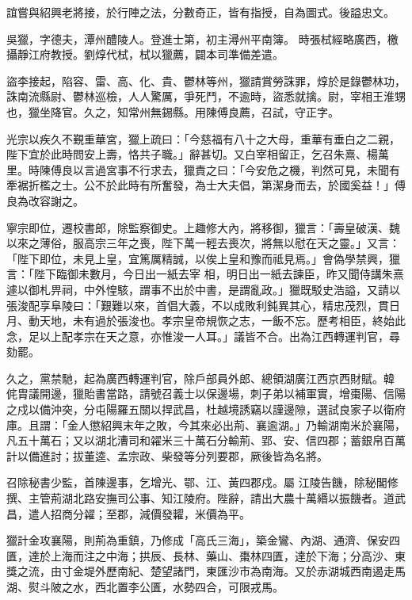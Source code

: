 \begin{pinyinscope}
 誼嘗與紹興老將接，於行陣之法，分數奇正，皆有指授，自為圖式。後謚忠文。



 吳獵，字德夫，潭州醴陵人。登進士第，初主潯州平南簿。
 時張栻經略廣西，檄攝靜江府教授。劉焞代栻，栻以獵薦，闢本司準備差遣。



 盜李接起，陷容、雷、高、化、貴、鬱林等州，獵請賞勞誅罪，焞於是錄鬱林功，誅南流縣尉、鬱林巡檢，人人驚厲，爭死鬥，不逾時，盜悉就擒。尉，宰相王淮甥也，獵坐降官。久之，知常州無錫縣。用陳傅良薦，召試，守正字。



 光宗以疾久不覲重華宮，獵上疏曰：「今慈福有八十之大母，重華有垂白之二親，陛下宜於此時問安上壽，恪共子職。」辭甚切。又白宰相留正，乞召朱熹、楊萬
 里。時陳傅良以言過宮事不行求去，獵責之曰：「今安危之機，判然可見，未聞有牽裾折檻之士。公不於此時有所奮發，為士大夫倡，第潔身而去，於國奚益！」傅良為改容謝之。



 寧宗即位，遷校書郎，除監察御史。上趣修大內，將移御，獵言：「壽皇破漢、魏以來之薄俗，服高宗三年之喪，陛下萬一輕去喪次，將無以慰在天之靈。」又言：「陛下即位，未見上皇，宜篤厲精誠，以俟上皇和豫而祗見焉。」會偽學禁興，獵言：「陛下臨御未數月，今日出一紙去宰
 相，明日出一紙去諫臣，昨又聞侍講朱熹遽以御札畀祠，中外惶駭，謂事不出於中書，是謂亂政。」獵既駁史浩謚，又請以張浚配享阜陵曰：「艱難以來，首倡大義，不以成敗利鈍異其心，精忠茂烈，貫日月、動天地，未有過於張浚也。孝宗皇帝規恢之志，一飯不忘。歷考相臣，終始此念，足以上配孝宗在天之意，亦惟浚一人耳。」議皆不合。出為江西轉運判官，尋劾罷。



 久之，黨禁馳，起為廣西轉運判官，除戶部員外郎、總領湖廣江西京西財賦。韓
 侂胄議開邊，獵貽書當路，請號召義士以保邊場，刺子弟以補軍實，增棗陽、信陽之戍以備沖突，分屯陽羅五關以捍武昌，杜越境誘竊以謹邊隙，選試良家子以衛府庫。且謂：「金人懲紹興末年之敗，今其來必出荊、襄逾湖。」乃輸湖南米於襄陽，凡五十萬石；又以湖北漕司和糴米三十萬石分輸荊、郢、安、信四郡；蓄銀帛百萬計以備進討；拔董逵、孟宗政、柴發等分列要郡，厥後皆為名將。



 召除秘書少監，首陳邊事，乞增光、鄂、江、黃四郡戍。屬
 江陵告饑，除秘閣修撰、主管荊湖北路安撫司公事、知江陵府。陛辭，請出大農十萬緡以振饑者。道武昌，遣人招商分糴；至郡，減價發糶，米價為平。



 獵計金攻襄陽，則荊為重鎮，乃修成「高氏三海」，築金鸞、內湖、通濟、保安四匱，達於上海而注之中海；拱辰、長林、藥山、棗林四匱，達於下海；分高沙、東獎之流，由寸金堤外歷南紀、楚望諸門，東匯沙市為南海。又於赤湖城西南遏走馬湖、熨斗陂之水，西北置李公匱，水勢四合，可限戎馬。




\end{pinyinscope}
